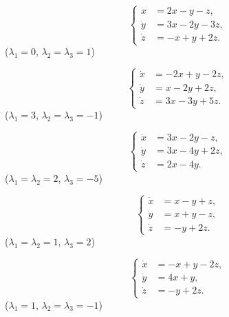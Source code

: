 \begin{multicols}{2}
    \begin{problem}
        \[ \left\{ \begin{aligned} 
            \dot x &= 2 x - y - z, \\
            \dot y &= 3 x - 2 y - 3 z, \\
            \dot z &= -x + y + 2 z.
        \end{aligned} \right. \]
        ($\lambda_1 = 0$, $\lambda_2 = \lambda_3 = 1$)
    \end{problem}
    
    \begin{problem}
        \[ \left\{ \begin{aligned} 
            \dot x &= - 2 x + y - 2 z, \\
            \dot y &= x - 2 y + 2 z, \\
            \dot z &= 3 x - 3 y + 5 z.
        \end{aligned} \right. \]
        ($\lambda_1 = 3$, $\lambda_2 = \lambda_3 = -1$)
    \end{problem}
    
    \begin{problem}
        \[ \left\{ \begin{aligned} 
            \dot x &= 3 x - 2 y - z, \\
            \dot y &= 3 x - 4 y + 2 z, \\
            \dot z &= 2 x - 4 y.
        \end{aligned} \right. \]
        ($\lambda_1 = \lambda_2 = 2$, $\lambda_3 = -5$)
    \end{problem}
    
    \begin{problem}
        \[ \left\{ \begin{aligned} 
            \dot x &= x - y + z, \\
            \dot y &= x + y - z, \\
            \dot z &= - y + 2 z.
        \end{aligned} \right. \]
        ($\lambda_1 = \lambda_2 = 1$, $\lambda_3 = 2$)
    \end{problem}
    
    \begin{problem}
        \[ \left\{ \begin{aligned} 
            \dot x &= - x + y - 2 z, \\
            \dot y &= 4 x + y, \\
            \dot z &= - y + 2 z.
        \end{aligned} \right. \]
        ($\lambda_1 = 1$, $\lambda_2 = \lambda_3 = -1$)
    \end{problem}
    

\end{multicols}

